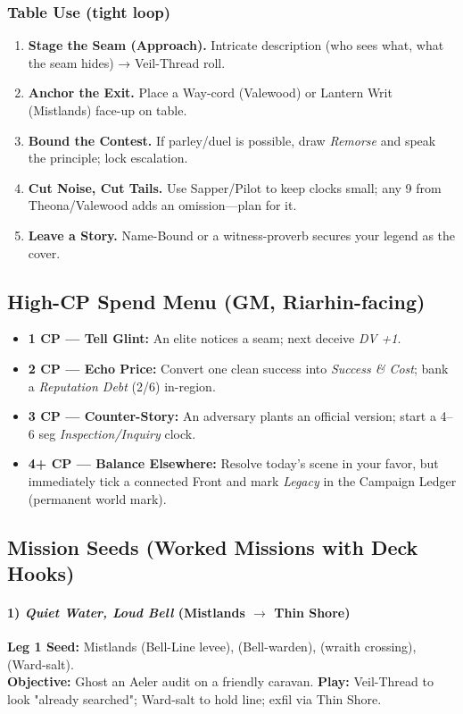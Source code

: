 \subsubsection{Table Use (tight loop)}
\begin{enumerate}
  \item \textbf{Stage the Seam (Approach).} Intricate description (who sees what, what the seam hides) → Veil-Thread roll.
  \item \textbf{Anchor the Exit.} Place a Way-cord (Valewood) or Lantern Writ (Mistlands) \SuitDiamond{} face-up on table.
  \item \textbf{Bound the Contest.} If parley/duel is possible, draw \emph{Remorse} and speak the principle; lock escalation.
  \item \textbf{Cut Noise, Cut Tails.} Use Sapper/Pilot to keep clocks small; any 9 from Theona/Valewood adds an omission—plan for it.
  \item \textbf{Leave a Story.} Name-Bound or a witness-proverb secures your legend as the cover.
\end{enumerate}

\subsection{High-CP Spend Menu (GM, Riarhin-facing)}
\begin{itemize}
  \item \textbf{1 CP — Tell Glint:} An elite notices a seam; next deceive \emph{DV +1}.
  \item \textbf{2 CP — Echo Price:} Convert one clean success into \emph{Success \& Cost}; bank a \emph{Reputation Debt} (2/6) in-region.
  \item \textbf{3 CP — Counter-Story:} An adversary plants an official version; start a 4–6 seg \emph{Inspection/Inquiry} clock.
  \item \textbf{4+ CP — Balance Elsewhere:} Resolve today's scene in your favor, but immediately tick a connected Front and mark \emph{Legacy} in the Campaign Ledger (permanent world mark).
\end{itemize}

\subsection{Mission Seeds (Worked Missions with Deck Hooks)}
\paragraph{1) \emph{Quiet Water, Loud Bell} (Mistlands $\to$ Thin Shore)}
\textbf{Leg 1 Seed:} Mistlands \SuitSpade{} (Bell-Line levee), \SuitHeart{} (Bell-warden), \SuitClub{} (wraith crossing), \SuitDiamond{} (Ward-salt). \\
\textbf{Objective:} Ghost an Aeler audit on a friendly caravan. \textbf{Play:} Veil-Thread to look "already searched"; Ward-salt to hold line; exfil via Thin Shore.

